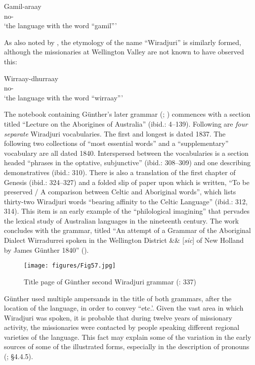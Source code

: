 \ea\label{ex:key:1}
\gll Gamil-araay \\
no- \\
\glt `the language with the word ``gamil'''
\z

As also noted by \citet[275]{ridley_report_1873}, the etymology of the name “Wiradjuri” is similarly formed, although the missionaries at Wellington Valley are not known to have observed this: 

\ea\label{ex:key:2}
\gll Wirraay-dhurraay  \\
no- \\
\glt `the language with the word ``wirraay'''
\z
    
The notebook containing Günther’s later grammar (\citeyear{gunther_lecture_1840}; ) commen\-ces with a section titled “Lecture on the Aborigines of Australia” (ibid.: 4--139). Following are \textit{four separate} Wiradjuri vocabularies. The first and longest is dated 1837. The following two collections of “most essential words” and a “supplementary” vocabulary are all dated 1840. Interspersed between the vocabularies is a section headed “phrases in the optative, subjunctive” (ibid.: 308--309) and one describing demonstratives (ibid.: 310). There is also a translation of the first chapter of Genesis (ibid.: 324--327) and a folded slip of paper upon which is written, “To be preserved / A comparison between Celtic and Aboriginal words”, which lists thirty-two Wiradjuri words “bearing affinity to the Celtic Language” (ibid.: 312, 314). This item is an early example of the “philological imagining” \citep[633]{capell_history_1970} that pervades the lexical study of Australian languages in the nineteenth century. The work concludes with the grammar, titled “An attempt of a Grammar of the Aboriginal Dialect Wirradurrei spoken in the Wellington District \&\& [\textit{sic}] of New Holland by James Günther 1840” ().

\begin{figure}[t]
\texttt{[image: figures/Fig57.jpg]}
\caption{Title page of Günther second Wiradjuri grammar (\citeyear{gunther_lecture_1840}: 337)}
\label{fig:4:57}
\end{figure}

Günther used multiple ampersands in the title of both grammars, after the location of the language, in order to convey “etc.’. Given the vast area in which Wiradjuri was spoken, it is probable that during twelve years of missionary activity, the missionaries were contacted by people speaking different regional varieties of the language. This fact may explain some of the variation in the early sources of some of the illustrated forms, especially in the description of pronouns (\citealt{Stockigt_2017}; §4.4.5).

